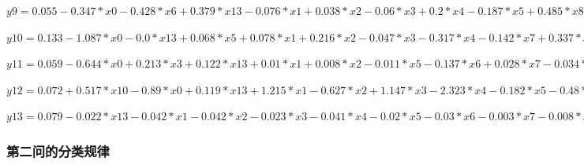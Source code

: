 \documentclass[UTF8]{ctexart}
\begin{document}
\noindent$y9 = 0.055 - 0.347 * x0 - 0.428 * x6 + 0.379 * x13 - 0.076 * x1 + 0.038 * x2 - 0.06 * x3 + 0.2 * x4 - 0.187 * x5 + 0.485 * x8 - 0.265 * x9 + 0.173 * x10 + 0.105 * x11 - 0.165 * x12 + 0.007 * x14$

\noindent$y10 = 0.133 - 1.087 * x0 - 0.0 * x13 + 0.068 * x5 + 0.078 * x1 + 0.216 * x2 - 0.047 * x3 - 0.317 * x4 - 0.142 * x7 + 0.337 * x8 + 0.018 * x9 - 0.064 * x10 - 0.042 * x11 - 0.104 * x12 - 0.006 * x14$

\noindent$y11 = 0.059 - 0.644 * x0 + 0.213 * x3 + 0.122 * x13 + 0.01 * x1 + 0.008 * x2 - 0.011 * x5 - 0.137 * x6 + 0.028 * x7 - 0.034 * x8 + 0.148 * x9 + 0.081 * x10 - 0.09 * x11 - 0.013 * x12 + 0.011 * x14$

\noindent$y12 = 0.072 + 0.517 * x10 - 0.89 * x0 + 0.119 * x13 + 1.215 * x1 - 0.627 * x2 + 1.147 * x3 - 2.323 * x4 - 0.182 * x5 - 0.48 * x6 + 0.387 * x7 - 0.592 * x8 + 0.124 * x9 - 0.36 * x12 + 0.062 * x14$

\noindent$y13 = 0.079 - 0.022 * x13 - 0.042 * x1 - 0.042 * x2 - 0.023 * x3 - 0.041 * x4 - 0.02 * x5 - 0.03 * x6 - 0.003 * x7 - 0.008 * x8 - 0.005 * x9 - 0.007 * x10 - 0.002 * x11 - 0.009 * x12 - 0.003 * x14$


\subsubsection*{第二问的分类规律}
\end{document}
